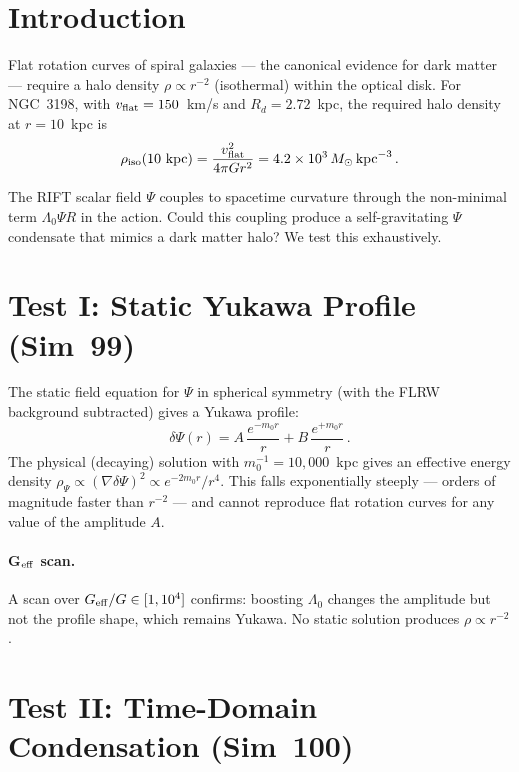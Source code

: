 \documentclass[12pt,a4paper]{article}
\begin{document}
\section{Introduction}

Flat rotation curves of spiral galaxies --- the canonical evidence for
dark matter --- require a halo density $\rho\propto r^{-2}$ (isothermal)
within the optical disk.  For NGC~3198, with $v_{\rm flat}=150$~km/s
and $R_d=2.72$~kpc, the required halo density at $r=10$~kpc is
\begin{equation}
\rho_{\rm iso}(10~{\rm kpc}) = \frac{v_{\rm flat}^2}{4\pi G r^2}
  = 4.2\times10^3\,M_\odot\,{\rm kpc}^{-3}\,.
\label{eq:iso}
\end{equation}

The RIFT scalar field $\Psi$ couples to spacetime curvature through the
non-minimal term $\Lambda_0\Psi R$ in the action.  Could this coupling
produce a self-gravitating $\Psi$ condensate that mimics a dark matter halo?
We test this exhaustively.

\section{Test I: Static Yukawa Profile (Sim~99)}

The static field equation for $\Psi$ in spherical symmetry (with the
FLRW background subtracted) gives a Yukawa profile:
\begin{equation}
\delta\Psi(r) = A\,\frac{e^{-m_0 r}}{r}
  + B\,\frac{e^{+m_0 r}}{r}\,.
\end{equation}
The physical (decaying) solution with $m_0^{-1}=10{,}000$~kpc gives an
effective energy density
$\rho_\Psi \propto (\nabla\delta\Psi)^2 \propto e^{-2m_0 r}/r^4$.
This falls exponentially steeply --- orders of magnitude faster than
$r^{-2}$ --- and cannot reproduce flat rotation curves for any value of
the amplitude $A$.

\paragraph{G$_{\rm eff}$ scan.} A scan over $G_{\rm eff}/G\in[1, 10^4]$
confirms: boosting $\Lambda_0$ changes the amplitude but not the profile
shape, which remains Yukawa.  No static solution produces
$\rho\propto r^{-2}$.

\section{Test II: Time-Domain Condensation (Sim~100)}
\end{document}
